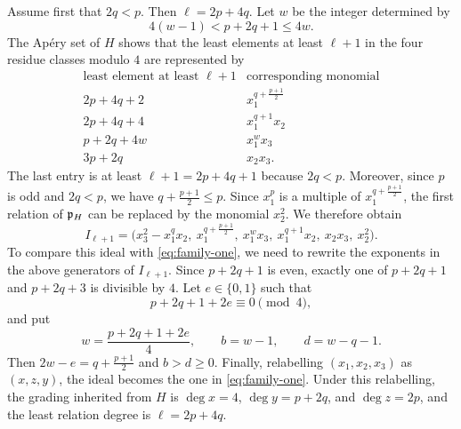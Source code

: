 Assume first that $2q<p$.  Then $\ell=2p+4q$.  Let $w$ be the
integer determined by
\[
 4(w-1)<p+2q+1\leq4w.
\]
The Ap\'ery set of $H$ shows that the least elements at least $\ell + 1$ in
the four residue classes modulo $4$ are represented by
\[
\begin{array}{c|c}
 \text{least element at least }\ell + 1&\text{corresponding monomial}\\ \hline
 2p+4q+2&x_1^{q+\frac{p+1}{2}}\\
 2p+4q+4&x_1^{q+1}x_2\\
 p+2q+4w&x_1^wx_3\\
 3p+2q&x_2x_3.
\end{array}
\]
The last entry is at least $\ell+1=2p+4q+1$ because $2q<p$.
Moreover, since $p$ is odd and $2q<p$, we have
$q+\frac{p+1}{2}\leq p$.
Since
$x_1^p$ is a multiple of $x_1^{q+\frac{p+1}{2}}$, the first relation
of $\mathfrak{p}_H$ can be replaced by the monomial
$x_2^2$.  We therefore obtain
\[
 I_{\ell+1} =\bigl(x_3^2-x_1^qx_2,\ x_1^{q+\frac{p+1}{2}},\ x_1^wx_3,\ x_1^{q+1}x_2,\ 
             x_2x_3,\ x_2^2\bigr).
\]
To compare this ideal with \eqref{eq:family-one}, we need to rewrite the
exponents in the above generators of $I_{\ell+1}$.
Since $p+2q+1$ is even, exactly one of
$p+2q+1$ and $p+2q+3$ is divisible by $4$.  
Let $e \in \{0,1\}$ such that
\[
 p+2q+1+2e\equiv0\pmod4,
\]
and put
\[
 w=\frac{p+2q+1+2e}{4},\qquad
 b=w-1,\qquad d=w-q-1.
\]
Then $2w-e=q+\frac{p+1}{2}$ and $b>d\geq0$.
Finally, relabelling $(x_1,x_2,x_3)$ as $(x,z,y)$, the ideal becomes the
one in \eqref{eq:family-one}.
Under this relabelling, the grading inherited from $H$ is
$\deg x=4$, $\deg y=p+2q$, and $\deg z=2p$, and the least relation degree is
$\ell=2p+4q$.


